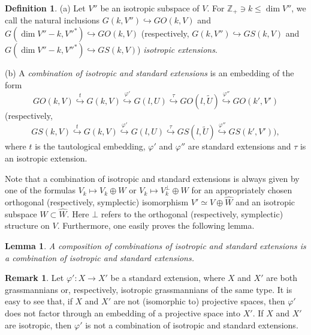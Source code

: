 \documentclass[12pt]{amsart}
\renewcommand{\phi}{\varphi}
\newtheorem{lemma}[theorem]{Lemma}
\theoremstyle{definition}
\newtheorem{definition}[theorem]{Definition}
\newtheorem{remark}[theorem]{Remark}
\begin{document}
\begin{definition}\label{isotr st ext}
(a) Let $V''$ be an isotropic subspace of $V$. For $\mathbb{Z}_+\ni k\le\dim V''$, we call
the natural inclusions $G(k,V'')\hookrightarrow GO(k,V)$ and $G(\dim V''-k,{V''}^*)\hookrightarrow GO(k,V)$
(respectively, $G(k,V'')\hookrightarrow GS(k,V)$ and $G(\dim V''-k,{V''}^*)\hookrightarrow GS(k,V)$)
\textit{isotropic extensions}.

(b) A \textit{combination of isotropic and standard extensions} is an embedding of the form
$$
GO(k,V)\overset{t}\hookrightarrow G(k,V)\overset{\phi'}\hookrightarrow G(l,U)\overset{\tau}\hookrightarrow
GO(l,\tilde{U})\overset{\phi''}\hookrightarrow GO(k',V')
$$
(respectively,
$$
GS(k,V)\overset{t}\hookrightarrow G(k,V)
\overset{\phi'}\hookrightarrow G(l,U)\overset{\tau}\hookrightarrow GS(l,\tilde{U})\overset{\phi''}\hookrightarrow
GS(k',V')),
$$
where $t$ is the tautological embedding, $\phi'$ and $\phi''$ are standard extensions and $\tau$ is an
isotropic extension.
\end{definition}

Note that a combination of isotropic and standard extensions is always given by one of the formulas
$V_k\mapsto V_k\oplus W$ or
$V_k\mapsto V_k^\bot\oplus W$ for an appropriately chosen orthogonal (respectively, symplectic) isomorphism
$V'\simeq V\oplus\hat{W}$ and an isotropic subspace $W\subset\hat{W}$. Here $\bot$ refers to the orthogonal
(respectively, symplectic) structure on $V$. Furthermore, one easily proves the following lemma.

\begin{lemma}\label{compos of combin}
A composition of combinations of isotropic and standard extensions is a combination of isotropic and standard
extensions.
\end{lemma}

\begin{remark}\label{prop of st ext}
Let $\phi':X\to X'$ be a standard extension, where $X$ and $X'$ are both grassmannians or, respectively, isotropic
grassmannians of the same type. It is easy to see that, if $X$ and $X'$ are not (isomorphic to) projective spaces,
then $\phi'$ does not factor through an embedding of a projective space into $X'$. If $X$ and $X'$ are isotropic, then
$\phi'$ is not a combination of isotropic and standard extensions.
\end{remark}
\end{document}
